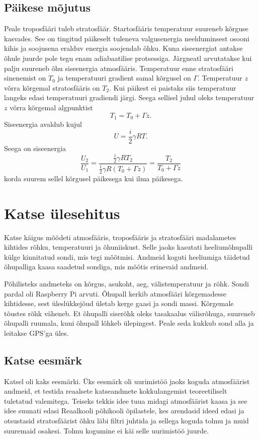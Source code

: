 \documentclass{trkut}%
\begin{document}
\section{Päikese mõjutus}
Peale troposfääri tuleb stratosfäär. Startosfääris temperatuur suureneb kõrguse kasvades. See on tingitud päikeselt tuleneva valgusenergia neelduminsest osooni kihis ja soojusena eralduv energia soojendab õhku. Kuna siseenergiat antakse õhule juurde pole tegu enam adiabaatilise protsessiga. Järgneatl arvutatakse kui palju suureneb õhu siseenergia atmosfääris. Temperatuur enne stratosfääri sinenemist on $T_0$ ja temperatuuri gradient samal kõrgusel on $\Gamma$. Temperatuur $z$ võrra kõrgemal stratosfääris on $T_2$. Kui päikest ei paistaks siis temperatuur langeks edasi temperatuuri gradiendi järgi. Seega sellisel juhul oleks temperatuur $z$ võrra kõrgemal algpunktist
\begin{equation*}
T_1 = T_0 + \Gamma z.
\end{equation*}
Siseenergia avaldub kujul
\begin{equation*}
U = \frac{i}{2}\gamma RT.
\end{equation*}
Seega on siseenergia 
\begin{equation*}
\frac{U_2}{U_1} = \frac{\frac{i}{2}\gamma RT_2}{\frac{i}{2}\gamma R\left(T_0 + \Gamma z\right)} = \frac{T_2}{T_0+\Gamma z}
\end{equation*}
korda suurem sellel kõrgusel päikesega kui ilma päikesega.





\chapter{Katse ülesehitus}
Katse käigus mõõdeti atmosfääris, troposfääris ja stratosfääri madalametes kihtides rõhku, temperatuuri ja õhuniiskust. Selle jaoks kasutati heeliumõhupalli külge kinnitatud sondi, mis tegi mõõtmisi. Andmeid koguti heeliumiga täidetud õhupalliga kaasa saadetud sondiga, mis mõõtis erinevaid andmeid.

Põhilisteks andmeteks on kõrgus, asukoht, aeg, välistemperatuur ja rõhk. Sondi pardal oli Raspberry Pi arvuti. Õhupall kerkib atmosfääri kõrgemadesse kihtidesse, sest üleslükkejõud ületab kerge gaasi ja sondi massi. Kõrgemale tõustes rõhk väheneb. Et õhupalli siserõhk oleks tasakaalus välisrõhuga, suureneb õhupalli ruumala, kuni õhupall lõhkeb ülepingest. Peale seda kukkub sond alla ja leitakse GPS'ga üles.


\section{Katse eesmärk}
Katsel oli kaks eesmärki. Üks eesmärk oli uurimistöö jaoks koguda atmosfäärist andmeid, et testida reaalsete katseandmete kokkulangemist teoreetiliselt tuletatud valemitega. Teiseks tekkis idee tuua midagi atmosfäärist kaasa ja see idee suunati edasi Reaalkooli põhikooli õpilastele, kes arendasid ideed edasi ja otsustasid stratosfäärist õhku läbi filtri juhtida ja sellega koguda tolmu ja muid suuremaid osakesi. Tolmu kogumine ei käi selle uurimistöö juurde.
\end{document}
